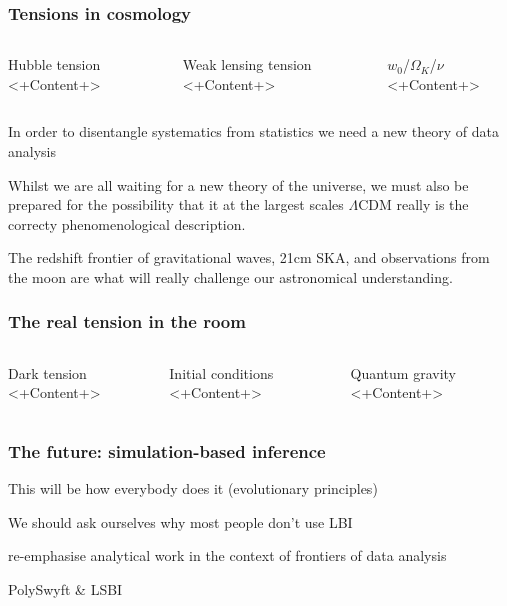 \documentclass[aspectratio=169]{beamer}
\begin{document}
\begin{frame}
    \frametitle{Tensions in cosmology}
    \begin{columns}
        \begin{block}{Hubble tension}
            <+Content+>
        \end{block}
        \begin{block}{Weak lensing tension}
            <+Content+>
        \end{block}
        \begin{block}{$w_0$/$\Omega_K$/$\nu$}
            <+Content+>
        \end{block}
    \end{columns}

    In order to disentangle systematics from statistics we need a new theory of data analysis

    Whilst we are all waiting for a new theory of the universe, we must also be prepared for the possibility that it at the largest scales $\Lambda$CDM really is the correcty phenomenological description.

    The redshift frontier of gravitational waves, 21cm SKA, and observations from the moon are what will really challenge our astronomical understanding.

\end{frame}

\begin{frame}
    \frametitle{The real tension in the room}

    \begin{columns}
        \begin{block}{Dark tension}
            <+Content+>
        \end{block}
        \begin{block}{Initial conditions}
            <+Content+>
        \end{block}
        \begin{block}{Quantum gravity}
            <+Content+>
        \end{block}
    \end{columns}
\end{frame}

\begin{frame}
    \frametitle{The future: simulation-based inference}

    This will be how everybody does it (evolutionary principles)

    We should ask ourselves why most people don't use LBI

    re-emphasise analytical work in the context of frontiers of data analysis

    PolySwyft \& LSBI
\end{frame}
\end{document}
